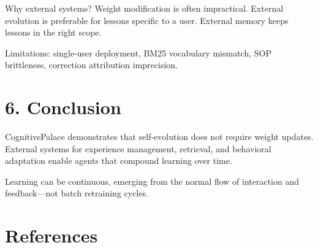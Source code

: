 \documentclass[11pt,a4paper]{article}
\begin{document}
Why external systems? Weight modification is often impractical. External evolution is preferable for lessons specific to a user. External memory keeps lessons in the right scope.

Limitations: single-user deployment, BM25 vocabulary mismatch, SOP brittleness, correction attribution imprecision.

\section{6. Conclusion}

CognitivePalace demonstrates that self-evolution does not require weight updates. External systems for experience management, retrieval, and behavioral adaptation enable agents that compound learning over time.

Learning can be continuous, emerging from the normal flow of interaction and feedback—not batch retraining cycles.

\section*{References}



\end{document}
